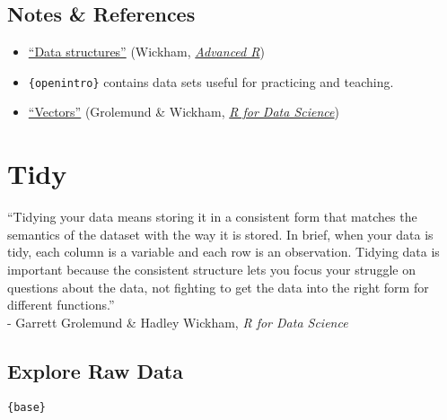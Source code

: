 \documentclass[
]{book}
\providecommand{\tightlist}{%
  \setlength{\itemsep}{0pt}\setlength{\parskip}{0pt}}
\begin{document}
\hypertarget{notes-references}{%
\section{Notes \& References}\label{notes-references}}

\begin{itemize}
\tightlist
\item
  \href{http://adv-r.had.co.nz/Data-structures.html}{``Data structures''} (Wickham, \href{http://adv-r.had.co.nz/}{\emph{Advanced R}})
\item
  \texttt{\{openintro\}} contains data sets useful for practicing and teaching.
\item
  \href{https://r4ds.had.co.nz/vectors.html}{``Vectors''} (Grolemund \& Wickham, \href{https://r4ds.had.co.nz/}{\emph{R for Data Science}})
\end{itemize}

\hypertarget{tidy}{%
\chapter{Tidy}\label{tidy}}

``Tidying your data means storing it in a consistent form that matches the semantics of the dataset with the way it is stored. In brief, when your data is tidy, each column is a variable and each row is an observation. Tidying data is important because the consistent structure lets you focus your struggle on questions about the data, not fighting to get the data into the right form for different functions.''\\
- Garrett Grolemund \& Hadley Wickham, \emph{R for Data Science}

\hypertarget{explore-raw-data}{%
\section{Explore Raw Data}\label{explore-raw-data}}

\texttt{\{base\}}
\end{document}
